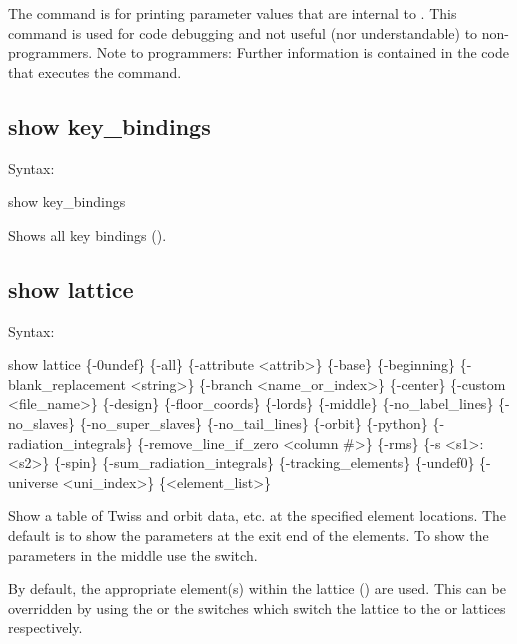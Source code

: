 {{{{{{{{The  command is for printing parameter values that are internal to \tao. This
command is used for code debugging and not useful (nor understandable) to non-programmers. Note to
programmers: Further information is contained in the code that executes the 
command.


\subsection{show key_bindings}
\label{s:show.key}

Syntax:
\begin{example}
  show key_bindings
\end{example}

Shows all key bindings ().


\subsection{show lattice}
\label{s:show.lattice}

Syntax:
\begin{example}
  show lattice \{-0undef\} \{-all\} \{-attribute <attrib>\} \{-base\} \{-beginning\}
      \{-blank_replacement <string>\}  \{-branch <name_or_index>\} \{-center\}
      \{-custom <file_name>\} \{-design\} \{-floor_coords\} \{-lords\} \{-middle\}
      \{-no_label_lines\} \{-no_slaves\} \{-no_super_slaves\} \{-no_tail_lines\} \{-orbit\} 
      \{-python\} \{-radiation_integrals\} \{-remove_line_if_zero <column \#>\} 
      \{-rms\} \{-s <s1>:<s2>\} \{-spin\} \{-sum_radiation_integrals\} \{-tracking_elements\} 
      \{-undef0\} \{-universe <uni_index>\} \{<element_list>\} 
\end{example}

Show a table of Twiss and orbit data, etc. at the specified element locations. The default is to
show the parameters at the exit end of the elements. To show the parameters in the middle use the
 switch.

By default, the appropriate element(s) within the  lattice () are
used. This can be overridden by using the  or the  switches which switch the
lattice to the  or  lattices respectively.

}}}}}}}}
